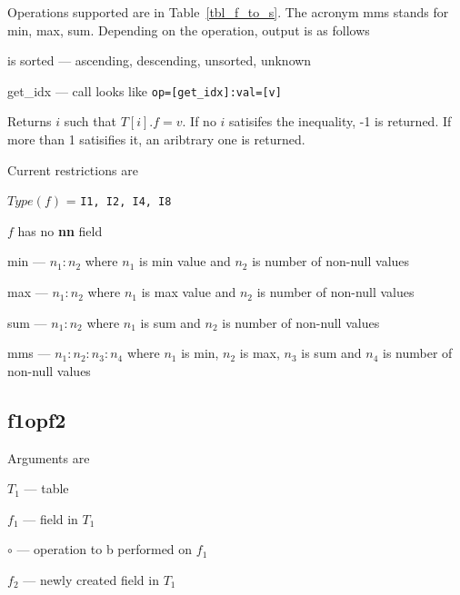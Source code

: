 Operations supported are in Table~\ref{tbl_f_to_s}. The acronym mms
stands for min, max, sum.
Depending on the operation, output is as follows
\be
\item is sorted --- ascending, descending, unsorted, unknown
\item get\_idx --- call looks like \verb+op=[get_idx]:val=[v]+ 

Returns \(i\) such that \(T[i].f = v\). If no \(i\) satisifes the
inequality, -1 is returned. If more than 1 satisifies it, an aribtrary
one is returned.

Current restrictions are
\be
\item \(Type(f)\) = {\tt I1, I2, I4, I8}
\item \(f\) has no {\bf nn} field 
\ee

\item min --- \(n_1:n_2\) where \(n_1\) is min value and \(n_2\) is
number of non-null values
\item max --- \(n_1:n_2\) where \(n_1\) is max value and \(n_2\) is
number of non-null values
\item sum --- \(n_1:n_2\) where \(n_1\) is sum       and \(n_2\) is
number of non-null values
\item mms --- \(n_1:n_2:n_3:n_4\) where \(n_1\) is min, \(n_2\) is max,
  \(n_3\) is sum and \(n_4\) is number of non-null values
\ee


\subsection{f1opf2}
\label{f1opf2}

Arguments are 
\be
\item \(T_1\) --- table
\item \(f_1\) --- field in \(T_1\)
\item \(\circ\)  --- operation to b performed on \(f_1\)
\item \(f_2\) --- newly created field in \(T_1\)
\ee

